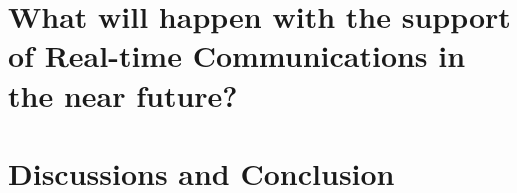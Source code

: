 
\chapter{What will happen with the support of Real-time Communications in the near future?}




\chapter{Discussions and Conclusion}
%